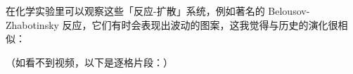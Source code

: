 \documentclass[12pt]{report}
\begin{document}
{在化学实验里可以观察这些「反应-扩散」系统，例如著名的 Belousov-Zhabotinsky 反应，它们有时会表现出波动的图案，这我觉得与历史的演化很相似：

\begin{figure}[ht]
\centering
{}
\end{figure}

（如看不到视频，以下是逐格片段：）

}
\end{document}
